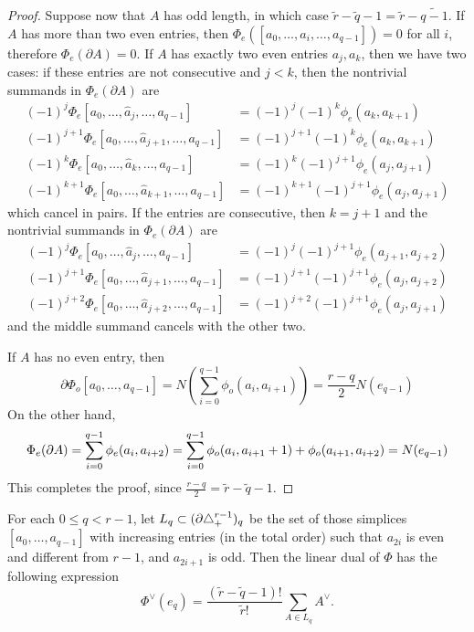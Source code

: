 \begin{proof}
	Suppose now that $A$ has odd length, in which case $\tilde{r}-\tilde{q}-1 = \tilde{r}-\widetilde{q-1} $. If $A$ has more than two even entries, then $\Phi_e([a_0,\ldots,\hat{a}_i,\ldots,a_{q-1}]) = 0$ for all $i$, therefore $\Phi_e(\partial A) = 0$. If $A$ has exactly two even entries $a_j,a_k$, then we have two cases: if these entries are not consecutive and $j<k$, then the nontrivial summands in $    \Phi_e(\partial A)$ are
	\begin{align*}
		(-1)^j\Phi_e[a_0,\ldots,\hat{a}_j,\ldots,a_{q-1}] &= (-1)^j(-1)^{k}\phi_e(a_k,a_{k+1}) \\
		(-1)^{j+1}\Phi_e[a_0,\ldots,\hat{a}_{j+1},\ldots,a_{q-1}] &=  (-1)^{j+1}(-1)^{k}\phi_e(a_k,a_{k+1})
		\\
		(-1)^{k}\Phi_e[a_0,\ldots,\hat{a}_k,\ldots,a_{q-1}] &= (-1)^k(-1)^{j+1}\phi_e(a_j,a_{j+1}) \\
		(-1)^{k+1}\Phi_e[a_0,\ldots,\hat{a}_{k+1},\ldots,a_{q-1}] &= (-1)^{k+1}(-1)^{j+1}\phi_e(a_j,a_{j+1})
	\end{align*}
	which cancel in pairs. If the entries are consecutive, then $k=j+1$ and the nontrivial summands in $\Phi_e(\partial A)$ are
	\begin{align*}
		(-1)^j\Phi_e[a_0,\ldots,\hat{a}_j,\ldots,a_{q-1}] &=  (-1)^{j}(-1)^{j+1}\phi_e(a_{j+1},a_{j+2}) \\
		(-1)^{j+1}\Phi_e[a_0,\ldots,\hat{a}_{j+1},\ldots,a_{q-1}] &= (-1)^{j+1}(-1)^{j+1}\phi_e(a_j,a_{j+2}) \\
		(-1)^{j+2}\Phi_e[a_0,\ldots,\hat{a}_{j+2},\ldots,a_{q-1}] &=  (-1)^{j+2}(-1)^{j+1}\phi_e(a_j,a_{j+1})
	\end{align*}
	and the middle summand cancels with the other two.

	If $A$ has no even entry, then
	\[
	\partial \Phi_o[a_0,\ldots,a_{q-1}] = N\left(\sum_{i=0}^{q-1} \phi_o(a_i,a_{i+1})\right) = \frac{r-q}{2}N(e_{q-1})
	\]
	On the other hand,
	\[
	\Phi_e(\partial A)
	= \sum_{i=0}^{q-1} \phi_e(a_i,a_{i+2}) \\
	= \sum_{i=0}^{q-1} \phi_o(a_{i},a_{i+1}+1) + \phi_o(a_{i+1},a_{i+2}) \\
	= N(e_{q-1})
	\]
	This completes the proof, since $\frac{r-q}{2} = \tilde{r}-\tilde{q}-1$.
\end{proof}

\begin{remark}
	For each $0\leq q<r-1$, let $L_q\subset (\partial \triangle_{+}^{r-1})_q$ be the set of those simplices $[a_0,\ldots, a_{q-1}]$ with increasing entries (in the total order) such that $a_{2i}$ is even and different from $r-1$, and $a_{2i+1}$ is odd. Then the linear dual of $\Phi$ has the following expression
	\begin{equation}\label{eq:111}
		\Phi^\vee(e_{q}) = \frac{(\tilde{r}-\tilde{q}-1)!}{\tilde{r}!}\sum_{A\in L_q} A^\vee.
	\end{equation}
\end{remark}
